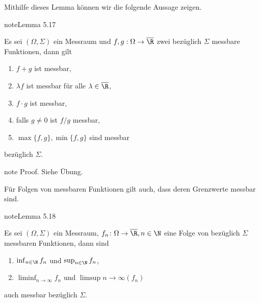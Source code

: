 \documentclass[letterpaper,10pt,german]{jupyterBook}
\begin{document}
\sphinxAtStartPar
Mithilfe dieses Lemma können wir die folgende Aussage zeigen.
\label{masstheorie/lebesgue_integral:lemma-6}
\begin{sphinxadmonition}{note}{Lemma 5.17}



\sphinxAtStartPar
Es sei \((\Omega,\Sigma)\) ein Messraum und \(f,g:\Omega\to\overline{\R}\) zwei bezüglich \(\Sigma\) messbare Funktionen, dann gilt
\begin{enumerate}
%
\item {} 
\sphinxAtStartPar
\(f+g\) ist messbar,

\item {} 
\sphinxAtStartPar
\(\lambda f\) ist messbar für alle \(\lambda\in\overline{\R}\),

\item {} 
\sphinxAtStartPar
\(f\cdot g\) ist messbar,

\item {} 
\sphinxAtStartPar
falls \(g\neq 0\) ist \(f/g\) messbar,

\item {} 
\sphinxAtStartPar
\(\max\{f,g\}, \min\{f,g\}\) sind messbar

\end{enumerate}

\sphinxAtStartPar
bezüglich \(\Sigma\).
\end{sphinxadmonition}

\begin{sphinxadmonition}{note}
\sphinxAtStartPar
Proof. Siehe Übung.
\end{sphinxadmonition}

\sphinxAtStartPar
Für Folgen von messbaren Funktionen gilt auch, dass deren Grenzwerte messbar sind.
\label{masstheorie/lebesgue_integral:lemma-7}
\begin{sphinxadmonition}{note}{Lemma 5.18}



\sphinxAtStartPar
Es sei \((\Omega,\Sigma)\) ein Messraum, \(f_n \colon \Omega\to\overline{\R},n\in\N\) eine Folge von bezüglich \(\Sigma\) messbaren Funktionen, dann sind
\begin{enumerate}
%
\item {} 
\sphinxAtStartPar
\(\inf_{n\in\N} f_n\) und \(\sup_{n\in\N} f_n\),

\item {} 
\sphinxAtStartPar
\(\liminf_{n\to\infty} f_n\) und \(\limsup{n\to\infty} (f_n)\)

\end{enumerate}

\sphinxAtStartPar
auch messbar bezüglich \(\Sigma\).
\end{sphinxadmonition}
\end{document}
